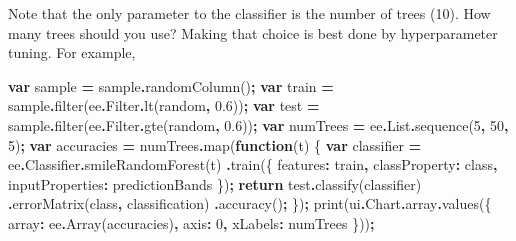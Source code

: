 \documentclass[
]{article}
\newenvironment{Shaded}{\begin{snugshade}}{\end{snugshade}}
\newcommand{\AttributeTok}[1]{\textcolor[rgb]{0.77,0.63,0.00}{#1}}
\newcommand{\ControlFlowTok}[1]{\textcolor[rgb]{0.13,0.29,0.53}{\textbf{#1}}}
\newcommand{\DataTypeTok}[1]{\textcolor[rgb]{0.13,0.29,0.53}{#1}}
\newcommand{\DecValTok}[1]{\textcolor[rgb]{0.00,0.00,0.81}{#1}}
\newcommand{\FloatTok}[1]{\textcolor[rgb]{0.00,0.00,0.81}{#1}}
\newcommand{\FunctionTok}[1]{\textcolor[rgb]{0.00,0.00,0.00}{#1}}
\newcommand{\KeywordTok}[1]{\textcolor[rgb]{0.13,0.29,0.53}{\textbf{#1}}}
\newcommand{\NormalTok}[1]{#1}
\newcommand{\OperatorTok}[1]{\textcolor[rgb]{0.81,0.36,0.00}{\textbf{#1}}}
\newcommand{\StringTok}[1]{\textcolor[rgb]{0.31,0.60,0.02}{#1}}
\begin{document}
Note that the only parameter to the classifier is the number of trees (10). How many trees should you use? Making that choice is best done by hyperparameter tuning. For example,

\begin{Shaded}
\begin{Highlighting}[]
\KeywordTok{var}\NormalTok{ sample  }\OperatorTok{=}\NormalTok{ sample}\OperatorTok{.}\FunctionTok{randomColumn}\NormalTok{()}\OperatorTok{;}
\KeywordTok{var}\NormalTok{ train }\OperatorTok{=}\NormalTok{ sample}\OperatorTok{.}\FunctionTok{filter}\NormalTok{(ee}\OperatorTok{.}\AttributeTok{Filter}\OperatorTok{.}\FunctionTok{lt}\NormalTok{(}\StringTok{\textquotesingle{}random\textquotesingle{}}\OperatorTok{,} \FloatTok{0.6}\NormalTok{))}\OperatorTok{;}
\KeywordTok{var}\NormalTok{ test }\OperatorTok{=}\NormalTok{ sample}\OperatorTok{.}\FunctionTok{filter}\NormalTok{(ee}\OperatorTok{.}\AttributeTok{Filter}\OperatorTok{.}\FunctionTok{gte}\NormalTok{(}\StringTok{\textquotesingle{}random\textquotesingle{}}\OperatorTok{,} \FloatTok{0.6}\NormalTok{))}\OperatorTok{;}
\KeywordTok{var}\NormalTok{ numTrees }\OperatorTok{=}\NormalTok{ ee}\OperatorTok{.}\AttributeTok{List}\OperatorTok{.}\FunctionTok{sequence}\NormalTok{(}\DecValTok{5}\OperatorTok{,} \DecValTok{50}\OperatorTok{,} \DecValTok{5}\NormalTok{)}\OperatorTok{;}
\KeywordTok{var}\NormalTok{ accuracies }\OperatorTok{=}\NormalTok{ numTrees}\OperatorTok{.}\FunctionTok{map}\NormalTok{(}\KeywordTok{function}\NormalTok{(t) \{}
\KeywordTok{var}\NormalTok{ classifier }\OperatorTok{=}\NormalTok{  ee}\OperatorTok{.}\AttributeTok{Classifier}\OperatorTok{.}\FunctionTok{smileRandomForest}\NormalTok{(t)}
                \OperatorTok{.}\FunctionTok{train}\NormalTok{(\{}
          \DataTypeTok{features}\OperatorTok{:}\NormalTok{ train}\OperatorTok{,}
          \DataTypeTok{classProperty}\OperatorTok{:} \StringTok{\textquotesingle{}class\textquotesingle{}}\OperatorTok{,}
          \DataTypeTok{inputProperties}\OperatorTok{:}\NormalTok{ predictionBands}
\NormalTok{  \})}\OperatorTok{;}
  \ControlFlowTok{return}\NormalTok{ test}\OperatorTok{.}\FunctionTok{classify}\NormalTok{(classifier)}
    \OperatorTok{.}\FunctionTok{errorMatrix}\NormalTok{(}\StringTok{\textquotesingle{}class\textquotesingle{}}\OperatorTok{,}  \StringTok{\textquotesingle{}classification\textquotesingle{}}\NormalTok{)}
    \OperatorTok{.}\FunctionTok{accuracy}\NormalTok{()}\OperatorTok{;}
\NormalTok{\})}\OperatorTok{;}
\FunctionTok{print}\NormalTok{(ui}\OperatorTok{.}\AttributeTok{Chart}\OperatorTok{.}\AttributeTok{array}\OperatorTok{.}\FunctionTok{values}\NormalTok{(\{}
  \DataTypeTok{array}\OperatorTok{:}\NormalTok{ ee}\OperatorTok{.}\FunctionTok{Array}\NormalTok{(accuracies)}\OperatorTok{,}
  \DataTypeTok{axis}\OperatorTok{:} \DecValTok{0}\OperatorTok{,}
  \DataTypeTok{xLabels}\OperatorTok{:}\NormalTok{ numTrees}
\NormalTok{\}))}\OperatorTok{;}  
\end{Highlighting}
\end{Shaded}
\end{document}
